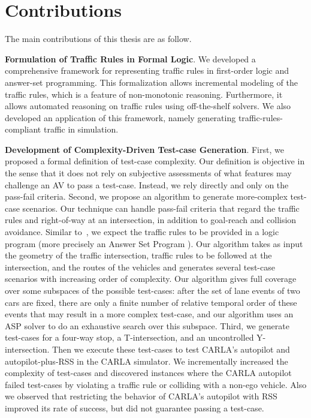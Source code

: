 \section{Contributions}

The main contributions of this thesis are as follow.

\textbf{Formulation of Traffic Rules in Formal Logic}.
We developed a comprehensive framework for representing traffic rules in first-order logic and answer-set programming.
%
This formalization allows incremental modeling of the traffic rules, which is a feature of non-monotonic reasoning.
%
Furthermore, it allows automated reasoning on traffic rules using off-the-shelf solvers.
%
We also developed an application of this framework, namely generating traffic-rules-compliant traffic in simulation.




\textbf{Development of Complexity-Driven Test-case Generation}.  
First, we proposed a formal definition of test-case complexity.
%
Our definition is objective in the sense that it does not rely on subjective assessments of what features may challenge an AV to pass a test-case.
%
Instead, we rely directly and only on the pass-fail criteria.
%
Second, we propose an algorithm to generate more-complex test-case scenarios.
%
Our technique can handle pass-fail criteria that regard the traffic rules and right-of-way at an intersection, in addition to goal-reach and collision avoidance.
%
Similar to~\cite{Karimi.2020}, we expect the traffic rules to be provided in a logic program (more precisely an Answer Set Program \cite{Lifschitz.2010}).
%
Our algorithm takes as input the geometry of the traffic intersection, traffic rules to be followed at the intersection, and the routes of the vehicles and generates several test-case scenarios with increasing order of complexity.
%
Our algorithm gives full coverage over some subspaces of the possible test-cases: after the set of lane events of two cars are fixed, there are only a finite number of relative temporal order of these events that may result in a more complex test-case, and our algorithm uses an ASP solver to do an exhaustive search over this subspace.
%
Third, we generate test-cases for a four-way stop, a T-intersection, and an uncontrolled Y-intersection.
%
Then we execute these test-cases to test CARLA's autopilot and autopilot-plus-RSS in the CARLA simulator.
%
We incrementally increased the complexity of test-cases and discovered instances where the CARLA autopilot failed test-cases by violating a traffic rule or colliding with a non-ego vehicle.
%
Also we observed that restricting the behavior of CARLA's autopilot with RSS improved its rate of success, but did not guarantee passing a test-case.





